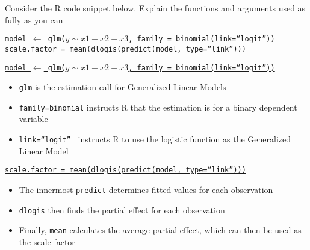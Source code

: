 
\question[3] Consider the R code snippet below. Explain the functions and arguments used as fully as you can

  \texttt{model $\leftarrow$ glm($y\sim x1+x2+x3$, family = binomial(link=``logit''))}\\
  \texttt{scale.factor = mean(dlogis(predict(model, type=``link'')))}

\begin{solution}[\halfpage]

  \underline{\texttt{model $\leftarrow$ glm($y\sim x1+x2+x3$, family = binomial(link=``logit''))}}
  \begin{itemize}
  \item{\texttt{glm} is the estimation call for Generalized Linear Models}
  \item{\texttt{family=binomial} instructs R that the estimation is for a binary dependent variable}
  \item{\texttt{link=``logit'' } instructs R to use the logistic function as the Generalized Linear Model}
  \end{itemize}

  \underline{\texttt{scale.factor = mean(dlogis(predict(model, type=``link'')))}}
  \begin{itemize}
  \item{The innermost \texttt{predict} determines fitted values for each observation}
  \item{\texttt{dlogis} then finds the partial effect for each observation}
  \item{Finally, \texttt{mean} calculates the average partial effect, which can then be used as the scale factor}
  \end{itemize}
\end{solution}

